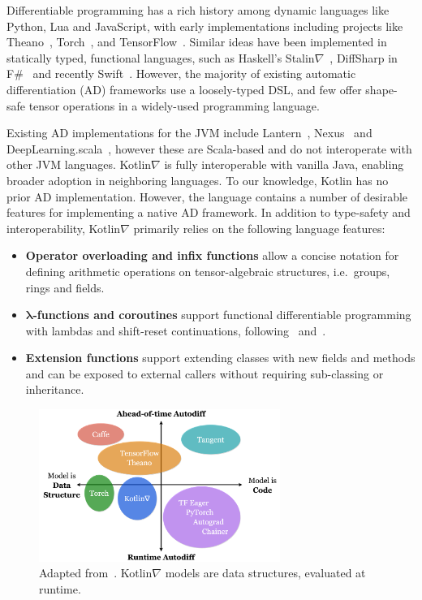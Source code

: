 \documentclass[12pt,initial,twoside,maitrise]{dms}
\numberwithin{equation}{section}
\numberwithin{table}{chapter}
\numberwithin{figure}{chapter}
\begin{document}
Differentiable programming has a rich history among dynamic languages like Python, Lua and JavaScript, with early implementations including projects like Theano~\cite{DBLP:journals-corr-Al-RfouAAa16}, Torch~\cite{collobert2002torch}, and TensorFlow~\cite{abadi2016tensorflow}. Similar ideas have been implemented in statically typed, functional languages, such as Haskell's Stalin$\nabla$~\cite{pearlmutter2008using}, DiffSharp in F\#~\cite{baydin-diffsharp} and recently Swift~\cite{swift}. However, the majority of existing automatic differentiation (AD) frameworks use a loosely-typed DSL, and few offer shape-safe tensor operations in a widely-used programming language.

Existing AD implementations for the JVM include Lantern~\cite{DBLP:journals-corr-abs-1803-10228}, Nexus~\cite{chen2017typesafe} and DeepLearning.scala~\cite{dl4s}, however these are Scala-based and do not interoperate with other JVM languages. Kotlin$\nabla$ is fully interoperable with vanilla Java, enabling broader adoption in neighboring languages. To our knowledge, Kotlin has no prior AD implementation. However, the language contains a number of desirable features for implementing a native AD framework. In addition to type-safety and interoperability, Kotlin$\nabla$ primarily relies on the following language features:

\begin{itemize}
\item \textbf{Operator overloading and infix functions} allow a concise notation for defining arithmetic operations on tensor-algebraic structures, i.e.\ groups, rings and fields.
\item \textbf{$\mathbf{\lambda}$-functions and coroutines} support functional differentiable programming with lambdas and shift-reset continuations, following~\cite{pearlmutter2008reverse} and~\cite{DBLP:journals-corr-abs-1803-10228}.
\item \textbf{Extension functions} support extending classes with new fields and methods and can be exposed to external callers without requiring sub-classing or inheritance.
\end{itemize}

\begin{figure}
    \centering
    \includegraphics[width=0.70\textwidth]{kotlingrad_diagram.png}
    \caption{Adapted from~\cite{van2018tangent}. Kotlin$\nabla$ models are data structures, evaluated at runtime.}
    \label{fig:kotlingrad_digram}
\end{figure}
\end{document}
